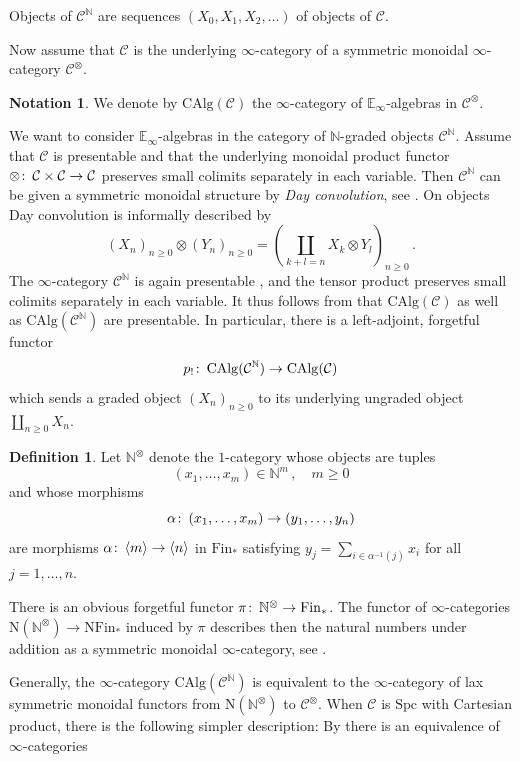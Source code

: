 \documentclass[oneside, a4paper, 12pt]{article}
\numberwithin{equation}{section}
\newcommand{\CAlg}{\mathrm{CAlg}}
\newcommand{\Spc}{\mathrm{Spc}}
\newcommand{\Fin}{\mathrm{Fin}}
\newcommand{\N}{\mathbb{N}}
\newcommand{\co}{\colon\thinspace}
\theoremstyle{plain}
\theoremstyle{definition}
\newtheorem{definition}[theorem]{Definition}
\newtheorem{notation}[theorem]{Notation}
\theoremstyle{remark}
\begin{document}
Objects of $\mathcal{C}^\N$ are sequences $(X_0,X_1,X_2,\dots)$ of objects of $\mathcal{C}$.

Now assume that $\mathcal{C}$ is the underlying $\infty$-category of a symmetric monoidal $\infty$-category $\mathcal{C}^\otimes$.

\begin{notation}
We denote by $\CAlg(\mathcal{C})$ the $\infty$-category of $\mathbb{E}_\infty$-algebras in $\mathcal{C}^\otimes$.
\end{notation}

We want to consider $\mathbb{E}_\infty$-algebras in the category of $\N$-graded objects $\mathcal{C}^\N$. Assume that $\mathcal{C}$ is presentable and that the underlying monoidal product functor $\otimes\co \mathcal{C}\times \mathcal{C}\to \mathcal{C}$ preserves small colimits separately in each variable. Then $\mathcal{C}^{\N}$ can be given a symmetric monoidal structure by \emph{Day convolution}, see \cite[Section 2.2.6]{HA}. On objects Day convolution is informally described by
\[
(X_n)_{n\geq 0} \otimes (Y_n)_{n\geq 0}=\left(\coprod_{k+l=n} X_k\otimes Y_l\right)_{n\geq 0}\,.
\]
The $\infty$-category $\mathcal{C}^\N$ is again presentable \cite[5.5.3.6]{HTT}, and the tensor product preserves small colimits separately in each variable. It thus follows from \cite[3.2.3.5]{HA} that $\CAlg(\mathcal{C})$ as well as $\CAlg(\mathcal{C}^\N)$ are presentable. In particular, there is a left-adjoint, forgetful functor
\[
p_{!}\co \CAlg(\mathcal{C}^\N) \to \CAlg(\mathcal{C})
\]
which sends a graded object $(X_n)_{n\geq 0}$ to its underlying ungraded object $\coprod_{n\geq 0} X_n$.


\begin{definition} \label{def:ntensor}
Let $\N^\otimes$ denote the $1$-category whose objects are tuples
\[
(x_1,\dots,x_m) \in \N^m\,, \quad m\geq 0
\]
and whose morphisms
\[
\alpha\co (x_1,\dots,x_m)\to (y_1,\dots,y_n)
\]
are morphisms $\alpha\co \langle m\rangle\to \langle n\rangle$ in $\Fin_\ast$ satisfying $y_j=\sum_{i\in \alpha^{-1}(j)} x_i$ for all $j=1,\dots,n$.
\end{definition}

There is an obvious forgetful functor $\pi\co \N^\otimes \to \Fin_\ast$. The functor of $\infty$-categories $\mathrm{N}(\N^\otimes)\to \mathrm{N}\Fin_\ast$ induced by $\pi$ describes then the natural numbers under addition as a symmetric monoidal $\infty$-category, see \cite[2.1.2.21]{HA}.

Generally, the $\infty$-category $\CAlg(\mathcal{C}^\N)$ is equivalent to the $\infty$-category of lax symmetric monoidal functors from $\mathrm{N}(\N^\otimes)$ to $\mathcal{C}^\otimes$. When $\mathcal{C}$ is $\Spc$ with Cartesian product, there is the following simpler description: By  \cite[2.4.1.7]{HA} there is an equivalence of $\infty$-categories
\end{document}
